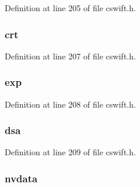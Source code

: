 Definition at line 205 of file cswift.\+h.

\subsubsection[{\texorpdfstring{crt}{crt}}]{ crt}\hypertarget{struct___s_w___p_a_r_a_m_a82332a4ff32d329f5f81ddc5788c27f1}{}\label{struct___s_w___p_a_r_a_m_a82332a4ff32d329f5f81ddc5788c27f1}


Definition at line 207 of file cswift.\+h.

\subsubsection[{\texorpdfstring{exp}{exp}}]{ exp}\hypertarget{struct___s_w___p_a_r_a_m_a8067fc15e275e21bc42fc5fab37b0743}{}\label{struct___s_w___p_a_r_a_m_a8067fc15e275e21bc42fc5fab37b0743}


Definition at line 208 of file cswift.\+h.

\subsubsection[{\texorpdfstring{dsa}{dsa}}]{ dsa}\hypertarget{struct___s_w___p_a_r_a_m_ae8c89dc9cb67406d97d4deecec15f445}{}\label{struct___s_w___p_a_r_a_m_ae8c89dc9cb67406d97d4deecec15f445}


Definition at line 209 of file cswift.\+h.

\subsubsection[{\texorpdfstring{nvdata}{nvdata}}]{ nvdata}\hypertarget{struct___s_w___p_a_r_a_m_a1b2c8b595a77684732b8cc969bb46253}{}\label{struct___s_w___p_a_r_a_m_a1b2c8b595a77684732b8cc969bb46253}


